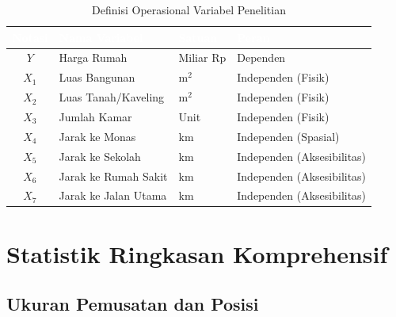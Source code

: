 \documentclass[12pt,a4paper]{article}
\begin{document}
\begin{table}[H]
\centering
\caption{Definisi Operasional Variabel Penelitian}
\label{tab:var_def}
\small
\begin{tabular}{clll}
\toprule
\rowcolor{headerblue}
\textcolor{white}{\textbf{Notasi}} & \textcolor{white}{\textbf{Nama Variabel}} & \textcolor{white}{\textbf{Satuan}} & \textcolor{white}{\textbf{Peran}} \\
\midrule
\rowcolor{rowlight}
$Y$   & Harga Rumah         & Miliar Rp & Dependen                   \\
$X_1$ & Luas Bangunan       & m$^2$     & Independen (Fisik)         \\
\rowcolor{rowlight}
$X_2$ & Luas Tanah/Kaveling & m$^2$     & Independen (Fisik)         \\
$X_3$ & Jumlah Kamar        & Unit      & Independen (Fisik)         \\
\rowcolor{rowlight}
$X_4$ & Jarak ke Monas      & km        & Independen (Spasial)       \\
$X_5$ & Jarak ke Sekolah    & km        & Independen (Aksesibilitas) \\
\rowcolor{rowlight}
$X_6$ & Jarak ke Rumah Sakit & km       & Independen (Aksesibilitas) \\
$X_7$ & Jarak ke Jalan Utama & km       & Independen (Aksesibilitas) \\
\bottomrule
\end{tabular}
\end{table}

\newpage
\section{Statistik Ringkasan Komprehensif}

\subsection{Ukuran Pemusatan dan Posisi}
\end{document}
